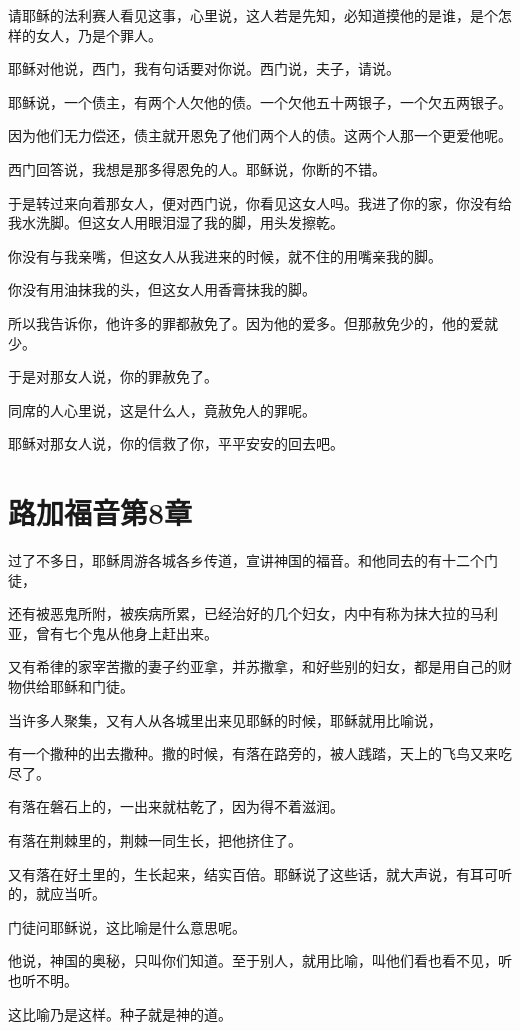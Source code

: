 \documentclass[12pt,oneside]{book}
\begin{document}
请耶稣的法利赛人看见这事，心里说，这人若是先知，必知道摸他的是谁，是个怎样的女人，乃是个罪人。

耶稣对他说，西门，我有句话要对你说。西门说，夫子，请说。

耶稣说，一个债主，有两个人欠他的债。一个欠他五十两银子，一个欠五两银子。

因为他们无力偿还，债主就开恩免了他们两个人的债。这两个人那一个更爱他呢。

西门回答说，我想是那多得恩免的人。耶稣说，你断的不错。

于是转过来向着那女人，便对西门说，你看见这女人吗。我进了你的家，你没有给我水洗脚。但这女人用眼泪湿了我的脚，用头发擦乾。

你没有与我亲嘴，但这女人从我进来的时候，就不住的用嘴亲我的脚。

你没有用油抹我的头，但这女人用香膏抹我的脚。

所以我告诉你，他许多的罪都赦免了。因为他的爱多。但那赦免少的，他的爱就少。

于是对那女人说，你的罪赦免了。

同席的人心里说，这是什么人，竟赦免人的罪呢。

耶稣对那女人说，你的信救了你，平平安安的回去吧。

\chapter{路加福音第8章}
过了不多日，耶稣周游各城各乡传道，宣讲神国的福音。和他同去的有十二个门徒，

还有被恶鬼所附，被疾病所累，已经治好的几个妇女，内中有称为抹大拉的马利亚，曾有七个鬼从他身上赶出来。

又有希律的家宰苦撒的妻子约亚拿，并苏撒拿，和好些别的妇女，都是用自己的财物供给耶稣和门徒。

当许多人聚集，又有人从各城里出来见耶稣的时候，耶稣就用比喻说，

有一个撒种的出去撒种。撒的时候，有落在路旁的，被人践踏，天上的飞鸟又来吃尽了。

有落在磐石上的，一出来就枯乾了，因为得不着滋润。

有落在荆棘里的，荆棘一同生长，把他挤住了。

又有落在好土里的，生长起来，结实百倍。耶稣说了这些话，就大声说，有耳可听的，就应当听。

门徒问耶稣说，这比喻是什么意思呢。

他说，神国的奥秘，只叫你们知道。至于别人，就用比喻，叫他们看也看不见，听也听不明。

这比喻乃是这样。种子就是神的道。
\end{document}
